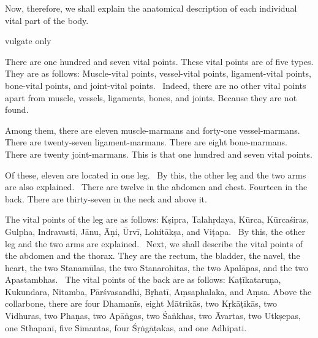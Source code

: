 \begin{translation}

  
\bigskip       

 \begin{tt}
    \raggedright
    \bigskip

           

\item[1]
Now, therefore, we shall explain the anatomical description of each individual vital part of the body. 

\item[2] vulgate only
\item[3]
There are one hundred and seven vital points.
These vital points are of five types.
They are as follows:
Muscle-vital points, vessel-vital points, ligament-vital points, bone-vital points, and joint-vital points.  Indeed, there are no other vital points apart from muscle, vessels, ligaments, bones, and joints. Because they are not found. 

\item[4]
Among them, there are eleven muscle-marmans and forty-one vessel-marmans. 
There are twenty-seven ligament-marmans.
There are eight bone-marmans. 
There are twenty joint-marmans.
This is that one hundred and seven vital points.

\item[5]
Of these, eleven are located in one leg. 
By this, the other leg and the two arms are also explained. 
There are twelve in the abdomen and chest.
Fourteen in the back.
There are thirty-seven in the neck and above it.

\item[6]
The vital points of the leg are as follows: Kṣipra, Talahṛdaya, Kūrca, Kūrcaśiras, Gulpha, Indravasti, Jānu, Āṇi, Ūrvī, Lohitākṣa, and Viṭapa.  By this, the other leg and the two arms are explained.  Next, we shall describe the vital points of the abdomen and the thorax. They are the rectum, the bladder, the navel, the heart, the two Stanamūlas, the two Stanarohitas, the two Apalāpas, and the two Apastambhas.  The vital points of the back are as follows: Kaṭīkataruṇa, Kukundara, Nitamba, Pārśvasandhi, Bṛhatī, Aṃsaphalaka, and Aṃsa. Above the collarbone, there are four Dhamanīs, eight Mātrikās, two Kṛkāṭikās, two Vidhuras, two Phaṇas, two Apāṅgas, two Śaṅkhas, two Āvartas, two Utkṣepas, one Sthapanī, five Sīmantas, four Śṛṅgāṭakas, and one Adhipati.


\end{tt}
\end{translation}
